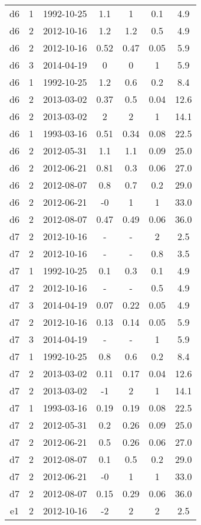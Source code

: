 \begin{table*}[htp]
\begin{tabular}{ccccccc}
d6 & 1 & 1992-10-25 & 1.1 & 1 & 0.1 & 4.9 \\
d6 & 2 & 2012-10-16 & 1.2 & 1.2 & 0.5 & 4.9 \\
d6 & 2 & 2012-10-16 & 0.52 & 0.47 & 0.05 & 5.9 \\
d6 & 3 & 2014-04-19 & 0 & 0 & 1 & 5.9 \\
d6 & 1 & 1992-10-25 & 1.2 & 0.6 & 0.2 & 8.4 \\
d6 & 2 & 2013-03-02 & 0.37 & 0.5 & 0.04 & 12.6 \\
d6 & 2 & 2013-03-02 & 2 & 2 & 1 & 14.1 \\
d6 & 1 & 1993-03-16 & 0.51 & 0.34 & 0.08 & 22.5 \\
d6 & 2 & 2012-05-31 & 1.1 & 1.1 & 0.09 & 25.0 \\
d6 & 2 & 2012-06-21 & 0.81 & 0.3 & 0.06 & 27.0 \\
d6 & 2 & 2012-08-07 & 0.8 & 0.7 & 0.2 & 29.0 \\
d6 & 2 & 2012-06-21 & -0 & 1 & 1 & 33.0 \\
d6 & 2 & 2012-08-07 & 0.47 & 0.49 & 0.06 & 36.0 \\
d7 & 2 & 2012-10-16 & - & - & 2 & 2.5 \\
d7 & 2 & 2012-10-16 & - & - & 0.8 & 3.5 \\
d7 & 1 & 1992-10-25 & 0.1 & 0.3 & 0.1 & 4.9 \\
d7 & 2 & 2012-10-16 & - & - & 0.5 & 4.9 \\
d7 & 3 & 2014-04-19 & 0.07 & 0.22 & 0.05 & 4.9 \\
d7 & 2 & 2012-10-16 & 0.13 & 0.14 & 0.05 & 5.9 \\
d7 & 3 & 2014-04-19 & - & - & 1 & 5.9 \\
d7 & 1 & 1992-10-25 & 0.8 & 0.6 & 0.2 & 8.4 \\
d7 & 2 & 2013-03-02 & 0.11 & 0.17 & 0.04 & 12.6 \\
d7 & 2 & 2013-03-02 & -1 & 2 & 1 & 14.1 \\
d7 & 1 & 1993-03-16 & 0.19 & 0.19 & 0.08 & 22.5 \\
d7 & 2 & 2012-05-31 & 0.2 & 0.26 & 0.09 & 25.0 \\
d7 & 2 & 2012-06-21 & 0.5 & 0.26 & 0.06 & 27.0 \\
d7 & 2 & 2012-08-07 & 0.1 & 0.5 & 0.2 & 29.0 \\
d7 & 2 & 2012-06-21 & -0 & 1 & 1 & 33.0 \\
d7 & 2 & 2012-08-07 & 0.15 & 0.29 & 0.06 & 36.0 \\
e1 & 2 & 2012-10-16 & -2 & 2 & 2 & 2.5 \\

\end{tabular}
\end{table*}
